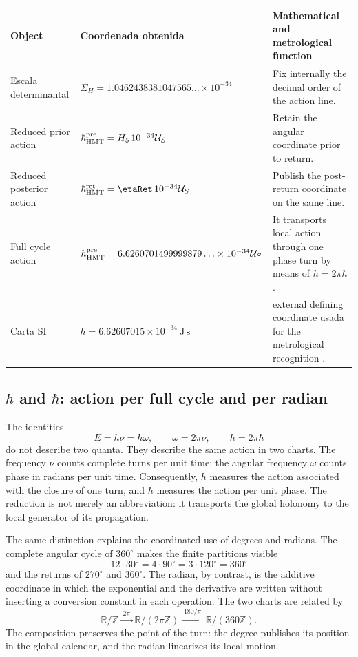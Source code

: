 \begin{center}
\begin{tabularx}{0.96\textwidth}{@{}L{0.22\textwidth}L{0.36\textwidth}Y@{}}
\toprule
Object & Coordenada obtenida & Mathematical and metrological function\\
\midrule
Escala determinantal &
\(\Sigma_H=1.0462438381047565\ldots\times10^{-34}\) &
Fix internally the decimal order of the action line.\\
Reduced prior action &
\(\hbar_{\rm HMT}^{\rm pre}=H_5\,10^{-34}\mathcal U_S\) &
Retain the angular coordinate prior to return.\\
Reduced posterior action &
\(\hbar_{\rm HMT}^{\rm ret}=\etaRet\,10^{-34}\mathcal U_S\) &
Publish the post-return coordinate on the same line.\\
Full cycle action &
\(h_{\rm HMT}^{\rm pre}=6.6260701499999879\ldots\times10^{-34}\mathcal U_S\) &
It transports local action through one phase turn by means of
\(h=2\pi\hbar\).\\
Carta SI &
\(h=6.62607015\times10^{-34}\ \mathrm{J\,s}\) &
external defining coordinate usada for the metrological recognition
\cite{BIPMSI}.\\
\bottomrule
\end{tabularx}
\end{center}

\subsection{\texorpdfstring{\(h\)}{h} and
\texorpdfstring{\(\hbar\)}{h bar}: action per full cycle and per radian}
\label{sec:accion-vuelta-radian-rev6}

The identities
\[
 E=h\nu=\hbar\omega,\qquad
 \omega=2\pi\nu,\qquad
 h=2\pi\hbar
\]
do not describe two quanta. They describe the same action in two charts. The
frequency \(\nu\) counts complete turns per unit time; the
angular frequency \(\omega\) counts phase in radians per unit time.
Consequently, \(h\) measures the action associated with the closure of one turn, and
\(\hbar\) measures the action per unit phase. The reduction is not merely an
abbreviation: it transports the global holonomy to the local generator of its
propagation.

The same distinction explains the coordinated use of degrees and radians. The complete
angular cycle of \(360^\circ\) makes the finite partitions visible
\[
 12\cdot30^\circ=4\cdot90^\circ
 =3\cdot120^\circ=360^\circ
\]
and the returns of \(270^\circ\) and \(360^\circ\). The radian, by contrast, is
the additive coordinate in which the exponential and the derivative are written without
inserting a conversion constant in each operation. The two charts are
related by
\[
 \mathbb R/\mathbb Z
 \xrightarrow{\;2\pi\;}
 \mathbb R/(2\pi\mathbb Z)
 \xrightarrow{\;180/\pi\;}
 \mathbb R/(360\mathbb Z).
\]
The composition preserves the point of the turn: the degree publishes its position
in the global calendar, and the radian linearizes its local motion.

